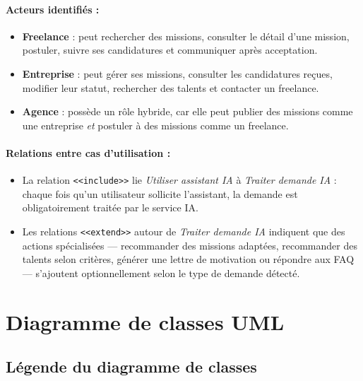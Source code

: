 \paragraph{Acteurs identifiés :}
\begin{itemize}
    \item \textbf{Freelance} : peut rechercher des missions, consulter le détail d'une mission, postuler, suivre ses candidatures et communiquer après acceptation.
    \item \textbf{Entreprise} : peut gérer ses missions, consulter les candidatures reçues, modifier leur statut, rechercher des talents et contacter un freelance.
    \item \textbf{Agence} : possède un rôle hybride, car elle peut publier des missions comme une entreprise \textit{et} postuler à des missions comme un freelance.
\end{itemize}

\paragraph{Relations entre cas d'utilisation :}
\begin{itemize}
    \item La relation \texttt{<<include>>} lie \textit{Utiliser assistant IA} à \textit{Traiter demande IA} : chaque fois qu'un utilisateur sollicite l'assistant, la demande est obligatoirement traitée par le service IA.
    \item Les relations \texttt{<<extend>>} autour de \textit{Traiter demande IA} indiquent que des actions spécialisées — recommander des missions adaptées, recommander des talents selon critères, générer une lettre de motivation ou répondre aux FAQ — s'ajoutent optionnellement selon le type de demande détecté.
\end{itemize}

\section{Diagramme de classes UML}

\subsection{Légende du diagramme de classes}


